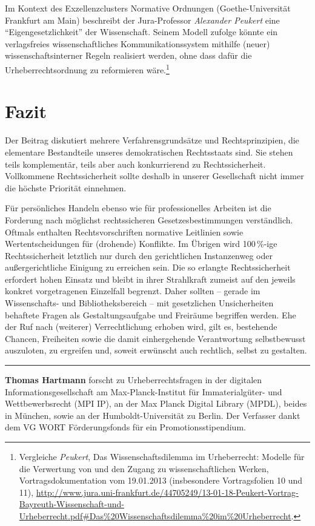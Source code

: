 \documentclass[output=paper]{langscibook}
\begin{document}
Im Kontext des Exzellenzclusters Normative Ordnungen (Goethe-Universität
Frankfurt am Main) beschreibt der Jura-Professor \emph{Alexander
Peukert} eine \enquote{Eigengesetzlichkeit} der Wissenschaft. Seinem
Modell zufolge könnte ein verlagsfreies wissenschaftliches
Kommunikationssystem mithilfe (neuer) wissenschaftsinterner Regeln
realisiert werden, ohne dass dafür die Urheberrechtsordnung zu
reformieren wäre.\footnote{Vergleiche \emph{Peukert}, Das Wissenschaftsdilemma
  im Urheberrecht: Modelle für die Verwertung von und den Zugang zu
  wissenschaftlichen Werken, Vortragsdokumentation vom 19.01.2013 (insbesondere
  Vortragsfolien 10 und 11),
  \url{http://www.jura.uni-frankfurt.de/44705249/13-01-18-Peukert-Vortrag-Bayreuth-Wissenschaft-und-Urheberrecht.pdf\#Das\%20Wissenschaftsdilemma\%20im\%20Urheberrecht}.}

\hypertarget{fazit}{%
\section{Fazit}\label{fazit}}

Der Beitrag diskutiert mehrere Verfahrensgrundsätze und
Rechtsprinzipien, die elementare Bestandteile unseres demokratischen
Rechtsstaats sind. Sie stehen teils komplementär, teils aber auch
konkurrierend zu Rechtssicherheit. Vollkommene Rechtssicherheit sollte
deshalb in unserer Gesellschaft nicht immer die höchste Priorität
einnehmen.

Für persönliches Handeln ebenso wie für professionelles Arbeiten ist die
Forderung nach möglichst rechtssicheren Gesetzesbestimmungen
verständlich. Oftmals enthalten Rechtsvorschriften normative Leitlinien
sowie Wertentscheidungen für (drohende) Konflikte. Im Übrigen wird
100\,\%-ige Rechtssicherheit letztlich nur durch den gerichtlichen
Instanzenweg oder außergerichtliche Einigung zu erreichen sein. Die so
erlangte Rechtssicherheit erfordert hohen Einsatz und bleibt in ihrer
Strahlkraft zumeist auf den jeweils konkret vorgetragenen Einzelfall
begrenzt. Daher sollten -- gerade im Wissenschafts- und
Bibliotheksbereich -- mit gesetzlichen Unsicherheiten behaftete Fragen
als Gestaltungsaufgabe und Freiräume begriffen werden. Ehe der Ruf nach
(weiterer) Verrechtlichung erhoben wird, gilt es, bestehende Chancen,
Freiheiten sowie die damit einhergehende Verantwortung selbstbewusst
auszuloten, zu ergreifen und, soweit erwünscht auch rechtlich, selbst zu
gestalten.

\begin{center}\rule{0.5\linewidth}{0.5pt}\end{center}


\textbf{Thomas Hartmann} forscht zu Urheberrechtsfragen in der digitalen
Informationsgesellschaft am Max-Planck-Institut für Immaterialgüter- und
Wettbewerbsrecht (MPI IP), an der Max Planck Digital Library (MPDL),
beides in München, sowie an der Humboldt-Universität zu Berlin. Der
Verfasser dankt dem VG WORT Förderungsfonds für ein
Promotionsstipendium.

\end{document}

